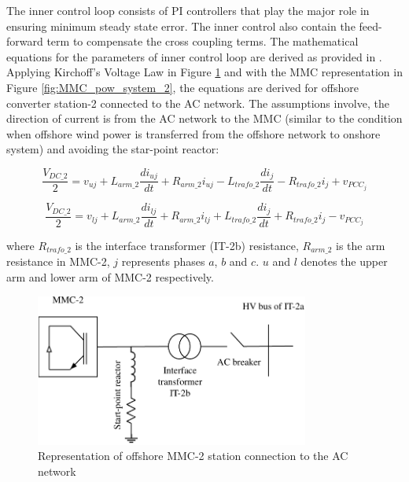 The inner control loop consists of \gls{PI} controllers that play the major role in ensuring minimum steady state error. The inner control also contain the feed-forward term to compensate the cross coupling terms. The mathematical equations for the parameters of inner control loop are derived as provided in \cite{saad2015modelisation}. Applying Kirchoff's Voltage Law in Figure \ref{fig:MMC_pow_system_1} and with the \gls{MMC} representation in Figure \ref{fig:MMC_pow_system_2}, the equations are derived for offshore converter station-2 connected to the \gls{AC} network. The assumptions involve, the direction of current is from the \gls{AC} network to the \gls{MMC} (similar to the condition when offshore wind power is transferred from the offshore network to onshore system) and avoiding the star-point reactor:

\begin{equation}
    \frac{V_{DC\_2}}{2} = v_{uj} + L_{arm\_2}\frac{di_{uj}}{dt} + R_{arm\_2}i_{uj} - L_{trafo\_2}\frac{di_{j}}{dt} - R_{trafo\_2}i_j + v_{PCC_j}
\end{equation}

\begin{equation}
    \frac{V_{DC\_2}}{2} = v_{lj} + L_{arm\_2}\frac{di_{lj}}{dt} + R_{arm\_2}i_{lj} + L_{trafo\_2}\frac{di_{j}}{dt} + R_{trafo\_2}i_j - v_{PCC_j}
\end{equation}

where $R_{trafo\_2}$ is the interface transformer (IT-2b) resistance, $R_{arm\_2}$ is the arm resistance in \gls{MMC}-2, $j$ represents phases $a$, $b$ and $c$. $u$ and $l$ denotes the upper arm and lower arm of \gls{MMC}-2 respectively.

\begin{figure}[H]
\centering
    \includegraphics[height = 5cm,width = 9cm]{Diagrams/Chapter_4/MMC_pow_system_1_new.pdf}
    \caption{Representation of offshore MMC-2 station connection to the AC network \cite{saad2015modelisation}}
    \label{fig:MMC_pow_system_1}
\end{figure}


